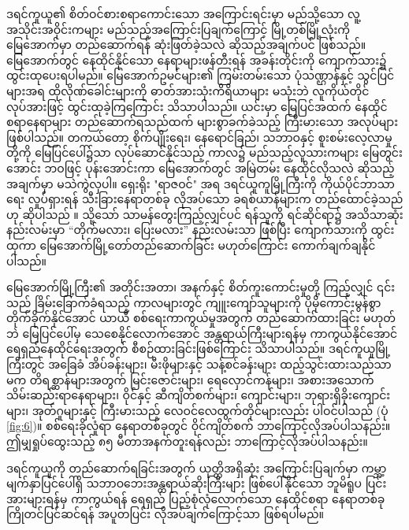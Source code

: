 \documentclass[10pt,twocolumn,letterpaper]{article}
\begin{document}
ဒရင်ကူယူ၏ စိတ်ဝင်စားစရာကောင်းသော အကြောင်းရင်းမှာ မည်သို့သော လူ့အသိုင်းအဝိုင်းကများ မည်သည့်အကြောင်းပြချက်ကြောင့် မြို့တစ်မြို့လုံးကို မြေအောက်မှာ တည်ဆောက်ရန် ဆုံးဖြတ်ခဲ့သလဲ ဆိုသည့်အချက်ပင် ဖြစ်သည်။ မြေအောက်တွင် နေထိုင်နိုင်သော နေရာများဖန်တီးရန် အခန်းတိုင်းကို ကျောက်သား၌ ထွင်းထုပေးရပါမည်။ မြေအောက်ဥမင်များ၏ ကြမ်းတမ်းသော ပုံသဏ္ဌာန်နှင့် သွင်ပြင်များအရ ထိုလိုဏ်ခေါင်းများကို ဓာတ်အားသုံးကိရိယာများ မသုံးဘဲ လူကိုယ်တိုင်လုပ်အားဖြင့် ထွင်းထုခဲ့ကြကြောင်း သိသာပါသည်။ ယင်းမှာ မြေပြင်အထက် နေထိုင်စရာနေရာများ တည်ဆောက်ရသည်ထက် များစွာခက်ခဲသည့် ကြီးမားသော အလုပ်များဖြစ်ပါသည်။ တကယ်တော့ စိုက်ပျိုးရေး၊ နေရောင်ခြည်၊ သဘာဝနှင့် စူးစမ်းလေ့လာမှုတို့ကို မြေပြင်ပေါ်၌သာ လုပ်ဆောင်နိုင်သည့် ကာလ၌ မည်သည့်လူသားကများ မြေတွင်းအောင်း ဘဝဖြင့် ပုန်းအောင်းကာ မြေအောက်တွင် အမြဲတမ်း နေထိုင်လိုသလဲ ဆိုသည့်အချက်မှာ မသဲကွဲလှပါ။ ရှေးရိုး "ရာဇဝင်" အရ ဒရင်ယူကူမြို့ကြီးကို ကိုယ်ပိုင်ဘာသာရေး လှုပ်ရှားရန် သီးခြားနေရာတစ်ခု လိုအပ်သော ခရစ်ယာန်များက တည်ထောင်ခဲ့သည်ဟု ဆိုပါသည် \cite{53}။ သို့သော် သာမန်တွေးကြည့်လျှင်ပင် ရန်သူကို ရင်ဆိုင်ရာ၌ အသိသာဆုံးနည်းလမ်းမှာ “တိုက်မလား၊ ပြေးမလား” နည်းလမ်းသာ ဖြစ်ပြီး ကျောက်သားကို ထွင်းထုကာ မြေအောက်မြို့တော်တည်ဆောက်ခြင်း မဟုတ်ကြောင်း ကောက်ချက်ချနိုင်ပါသည်။

မြေအောက်မြို့ကြီး၏ အတိုင်းအတာ၊ အနက်နှင့် စိတ်ကူးကောင်းမှုတို့ ကြည့်လျှင် ၎င်းသည် ခြိမ်းခြောက်ခံရသည့် ကာလများတွင် ကျူးကျော်သူများကို ပိုမိုကောင်းမွန်စွာ တိုက်ခိုက်နိုင်အောင် ယာယီ စစ်ရေးကာကွယ်မှုအတွက် တည်ဆောက်ထားခြင်း မဟုတ်ဘဲ မြေပြင်ပေါ်မှ သေစေနိုင်လောက်အောင် အန္တရာယ်ကြီးများရန်မှ ကာကွယ်နိုင်အောင် ‌ရေရှည်နေထိုင်ရေးအတွက် စီစဉ်ထားခြင်းဖြစ်ကြောင်း သိသာပါသည်။ ဒရင်ကူယူမြို့ကြီးတွင် အခြေခံ အိပ်ခန်းများ၊ မီးဖိုများနှင့် သန့်စင်ခန်းများ ထည့်သွင်းထားသည်သာမက တိရစ္ဆာန်များအတွက် မြင်းဇောင်းများ၊ ရေလှောင်ကန်များ၊ အစားအသောက် သိမ်းဆည်းရာနေရာများ၊ ဝိုင်နှင့် ဆီကျိတ်စက်များ၊ ကျောင်းများ၊ ဘုရားရှိခိုးကျောင်းများ၊ အုတ်ဂူများနှင့် ကြီးမားသည့် လေဝင်လေထွက်တိုင်များလည်း ပါဝင်ပါသည် (ပုံ \ref{fig:6})။ စစ်ရေးခိုလှုံရာ နေရာတစ်ခုတွင် ဝိုင်ကျိတ်စက် ဘာကြောင့်လိုအပ်ပါသနည်း။ ဤမျှရှုပ်ထွေးသည့် ၈၅ မီတာအနက်တူးရန်လည်း ဘာကြောင့်လိုအပ်ပါသနည်း။

ဒရင်ကူယူကို တည်ဆောက်ရခြင်းအတွက် ယုတ္တိအရှိဆုံး အကြောင်းပြချက်မှာ ကမ္ဘာ့မျက်နှာပြင်ပေါ်ရှိ သဘာဝဘေးအန္တရာယ်ဆိုးကြီးများ ဖြစ်ပေါ်နိုင်သော ဘူမိရူပ ပြင်းအားများရန်မှ ကာကွယ်ရန် ရေရှည် ပြည့်စုံလုံလောက်သော နေထိုင်စရာ နေရာတစ်ခု ကြိုတင်ပြင်ဆင်ရန် အပူတပြင်း လိုအပ်ချက်ကြောင့်သာ ဖြစ်ရပါမည်။
\end{document}
